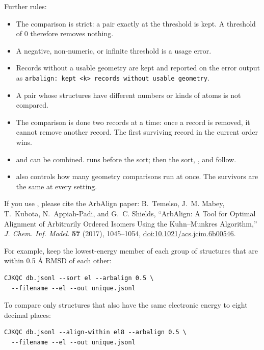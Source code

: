 Further rules:

\begin{itemize}
  \item The comparison is strict: a pair exactly at the threshold is kept.
        A threshold of 0 therefore removes nothing.
  \item A negative, non-numeric, or infinite threshold is a usage error.
  \item Records without a usable geometry are kept and reported on the error
        output as
        \texttt{arbalign: kept <k> records without usable geometry}.
  \item A pair whose structures have different numbers or kinds of atoms is
        not compared.
  \item The comparison is done two records at a time: once a record is
        removed, it cannot remove another record. The first surviving record
        in the current order wins.
  \item {} and  can be combined. 
        runs before the sort; then the sort, , and
         follow.
  \item {} also controls how many geometry comparisons run at
        once. The survivors are the same at every setting.
\end{itemize}

\begin{note}
If you use , please cite the ArbAlign paper:
B.~Temelso, J.~M. Mabey, T.~Kubota, N.~Appiah-Padi, and G.~C. Shields,
``ArbAlign: A Tool for Optimal Alignment of Arbitrarily Ordered Isomers
Using the Kuhn--Munkres Algorithm,'' \emph{J. Chem. Inf. Model.}
\textbf{57} (2017), 1045--1054,
\href{https://doi.org/10.1021/acs.jcim.6b00546}{doi:10.1021/acs.jcim.6b00546}.
\end{note}

For example, keep the lowest-energy member of each group of structures that
are within 0.5 \AA{} RMSD of each other:

\begin{verbatim}
CJKQC db.jsonl --sort el --arbalign 0.5 \
  --filename --el --out unique.jsonl
\end{verbatim}

To compare only structures that also have the same electronic energy to eight
decimal places:

\begin{verbatim}
CJKQC db.jsonl --align-within el8 --arbalign 0.5 \
  --filename --el --out unique.jsonl
\end{verbatim}

